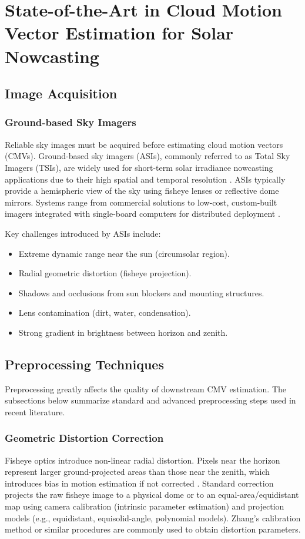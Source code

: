 \section{State-of-the-Art in Cloud Motion Vector Estimation for Solar Nowcasting}
\subsection{Image Acquisition}
\label{sec:acquisition_preproc}

\subsubsection*{Ground-based Sky Imagers}
Reliable sky images must be acquired before estimating cloud motion vectors (CMVs). Ground-based sky imagers (ASIs), commonly referred to as Total Sky Imagers (TSIs), are widely used for short-term solar irradiance nowcasting applications due to their high spatial and temporal resolution \cite{chow2011,urquhart2016,pfister2003,lin2023}. ASIs typically provide a hemispheric view of the sky using fisheye lenses or reflective dome mirrors. Systems range from commercial solutions to low-cost, custom-built imagers integrated with single-board computers for distributed deployment \cite{ghonima2012,dev2020}.

Key challenges introduced by ASIs include:
\begin{itemize}
  \item Extreme dynamic range near the sun (circumsolar region).
  \item Radial geometric distortion (fisheye projection).
  \item Shadows and occlusions from sun blockers and mounting structures.
  \item Lens contamination (dirt, water, condensation).
  \item Strong gradient in brightness between horizon and zenith.
\end{itemize}

\subsection{Preprocessing Techniques}
Preprocessing greatly affects the quality of downstream CMV estimation. The subsections below summarize standard and advanced preprocessing steps used in recent literature.

\subsubsection*{Geometric Distortion Correction}
Fisheye optics introduce non-linear radial distortion. Pixels near the horizon represent larger ground-projected areas than those near the zenith, which introduces bias in motion estimation if not corrected \cite{werkmeister2015}. Standard correction projects the raw fisheye image to a physical dome or to an equal-area/equidistant map using camera calibration (intrinsic parameter estimation) and projection models (e.g., equidistant, equisolid-angle, polynomial models). Zhang's calibration method \cite{zhang2000} or similar procedures are commonly used to obtain distortion parameters.

